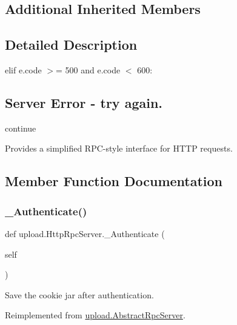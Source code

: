 \subsection*{Additional Inherited Members}


\subsection{Detailed Description}
elif e.\+code $>$= 500 and e.\+code $<$ 600\+: 

\subsection*{Server Error -\/ try again.}

continue \begin{DoxyVerb}Provides a simplified RPC-style interface for HTTP requests.\end{DoxyVerb}
 

\subsection{Member Function Documentation}
\mbox{\label{classupload_1_1_http_rpc_server_ab46a30c5aaa9f4d8f5a4bcb32293010e}} 
\subsubsection{\texorpdfstring{\_Authenticate()}{\_Authenticate()}\hspace{0.1cm}{\footnotesize\ttfamily [1/2]}}
{\footnotesize\ttfamily def upload.\+Http\+Rpc\+Server.\+\_\+\+Authenticate (\begin{DoxyParamCaption}\item[{}]{self }\end{DoxyParamCaption})\hspace{0.3cm}{\ttfamily [private]}}

\begin{DoxyVerb}Save the cookie jar after authentication.\end{DoxyVerb}
 

Reimplemented from \mbox{\hyperlink{classupload_1_1_abstract_rpc_server_a8517a9d90ee2478752a53302f01d868d}{upload.\+Abstract\+Rpc\+Server}}.

\mbox{\label{classupload_1_1_http_rpc_server_ab46a30c5aaa9f4d8f5a4bcb32293010e}} 
